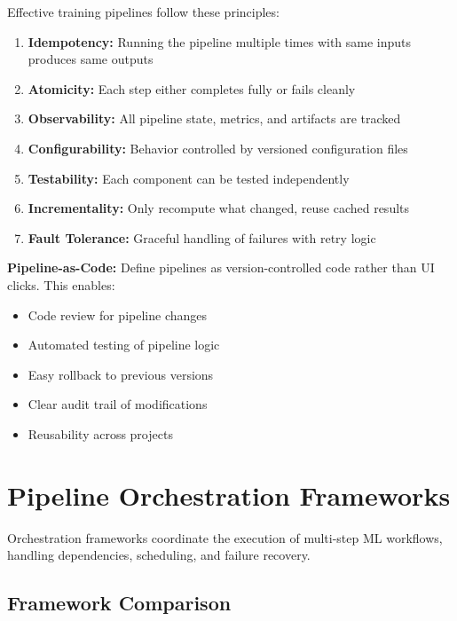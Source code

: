Effective training pipelines follow these principles:

\begin{enumerate}
    \item \textbf{Idempotency:} Running the pipeline multiple times with same inputs produces same outputs
    \item \textbf{Atomicity:} Each step either completes fully or fails cleanly
    \item \textbf{Observability:} All pipeline state, metrics, and artifacts are tracked
    \item \textbf{Configurability:} Behavior controlled by versioned configuration files
    \item \textbf{Testability:} Each component can be tested independently
    \item \textbf{Incrementality:} Only recompute what changed, reuse cached results
    \item \textbf{Fault Tolerance:} Graceful handling of failures with retry logic
\end{enumerate}

\begin{bestpractice}
\textbf{Pipeline-as-Code:} Define pipelines as version-controlled code rather than UI clicks. This enables:
\begin{itemize}
    \item Code review for pipeline changes
    \item Automated testing of pipeline logic
    \item Easy rollback to previous versions
    \item Clear audit trail of modifications
    \item Reusability across projects
\end{itemize}
\end{bestpractice}

\section{Pipeline Orchestration Frameworks}

Orchestration frameworks coordinate the execution of multi-step ML workflows, handling dependencies, scheduling, and failure recovery.

\subsection{Framework Comparison}

